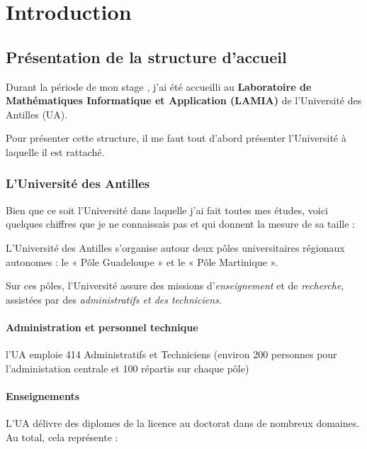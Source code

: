 \hypertarget{Introduction}{%
\chapter{Introduction}\label{Introduction}}

\section{Présentation de la structure
d'accueil}

Durant la période de mon stage , j'ai été accueilli au
\textbf{Laboratoire de Mathématiques Informatique et Application
(LAMIA)} de l'Université des Antilles (UA).

Pour présenter cette structure, il me faut tout d'abord présenter
l'Université à laquelle il est rattaché.

\hypertarget{lUniversite-des-antilles}{%
\subsection{L'Université des Antilles}\label{luniversite-des-antilles}}

Bien que ce soit l'Université dans laquelle j'ai fait toutes mes études,
voici quelques chiffres que je ne connaissais pas et qui donnent la
mesure de sa taille :

L'Université des Antilles s'organise autour deux pôles universitaires
régionaux autonomes : le « Pôle Guadeloupe » et le « Pôle Martinique ».

Sur ces pôles, l'Université assure des missions d'\emph{enseignement} et
de \emph{recherche}, assistées par des \emph{administratifs et des
techniciens}.

\hypertarget{administration-et-personnel-technique}{%
\subsubsection{Administration et personnel
technique}
\label{administration-et-personnel-technique}}

l'UA emploie 414 Administratifs et Techniciens (environ 200 personnes
pour l'administation centrale et 100 répartis sur chaque pôle)

\hypertarget{enseignements}{%
\subsubsection{Enseignements}\label{enseignements}}

L'UA délivre des diplomes de la licence au doctorat dans de nombreux
domaines. Au total, cela représente :

